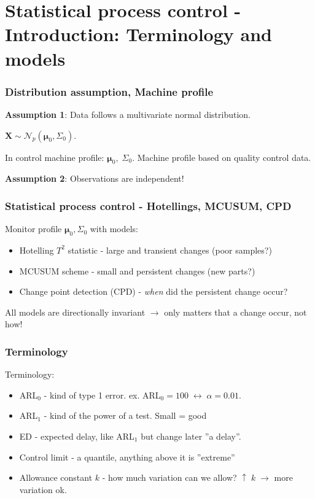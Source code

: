 \documentclass[10pt]{beamer}\usepackage[]{graphicx}\usepackage[]{color}
\begin{document}

\section[SPC - models]{Statistical process control - Introduction: Terminology and models}

\begin{frame}\frametitle{Distribution assumption, Machine profile}
\textbf{Assumption 1}: Data follows a multivariate normal distribution.
\begin{center}
$\mathbf{X} \sim \mathcal{N}_p(\boldsymbol{\mu}_0, \Sigma_0)$.
\end{center}
In control machine profile: $\boldsymbol{\mu}_0,\; \Sigma_0$. Machine profile based on quality control data.

\textbf{Assumption 2}: Observations are independent!
\end{frame}


\begin{frame}\frametitle{Statistical process control - Hotellings, MCUSUM, CPD}
Monitor profile $\boldsymbol{\mu}_0, \Sigma_0$ with models:
 \begin{itemize}
 \item Hotelling $T^2$ statistic - large and transient changes (poor samples?)
 \item MCUSUM scheme - small and persistent changes (new parts?)
 \item Change point detection (CPD) - \textit{when} did the persistent change occur?
 \end{itemize}
 All models are directionally invariant $\rightarrow$ only matters that a change occur, not how! 
\end{frame}

\begin{frame}\frametitle{Terminology}
Terminology:
 \begin{itemize}
 \item ARL$_0$ - kind of type 1 error. ex. ARL$_0 = 100\; \leftrightarrow \; \alpha=0.01$.
 \item ARL$_1$ - kind of the power of a test. Small = good 
 \item ED - expected delay, like ARL$_1$ but change later ''a delay''.
 \item Control limit - a quantile, anything above it is ''extreme''
 \item Allowance constant $k$ - how much variation can we allow? $\uparrow\; k\; \rightarrow$ more variation ok.
 \end{itemize}
 \end{frame}
 
\end{document}
